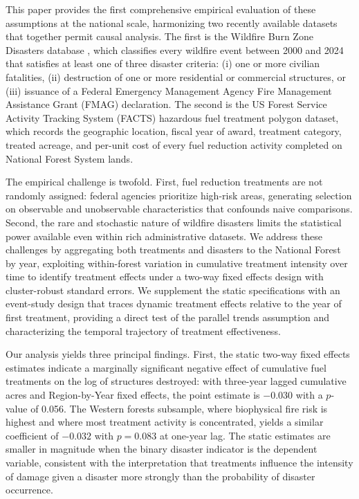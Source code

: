 \documentclass[12pt, letterpaper]{article}
\begin{document}
This paper provides the first comprehensive empirical evaluation of these assumptions at the national scale, harmonizing two recently available datasets that together permit causal analysis. The first is the Wildfire Burn Zone Disasters database \citep{wilner2025}, which classifies every wildfire event between 2000 and 2024 that satisfies at least one of three disaster criteria: (i) one or more civilian fatalities, (ii) destruction of one or more residential or commercial structures, or (iii) issuance of a Federal Emergency Management Agency Fire Management Assistance Grant (FMAG) declaration. The second is the US Forest Service Activity Tracking System (FACTS) hazardous fuel treatment polygon dataset, which records the geographic location, fiscal year of award, treatment category, treated acreage, and per-unit cost of every fuel reduction activity completed on National Forest System lands.

The empirical challenge is twofold. First, fuel reduction treatments are not randomly assigned: federal agencies prioritize high-risk areas, generating selection on observable and unobservable characteristics that confounds naive comparisons. Second, the rare and stochastic nature of wildfire disasters limits the statistical power available even within rich administrative datasets. We address these challenges by aggregating both treatments and disasters to the National Forest by year, exploiting within-forest variation in cumulative treatment intensity over time to identify treatment effects under a two-way fixed effects design with cluster-robust standard errors. We supplement the static specifications with an event-study design that traces dynamic treatment effects relative to the year of first treatment, providing a direct test of the parallel trends assumption and characterizing the temporal trajectory of treatment effectiveness.

Our analysis yields three principal findings. First, the static two-way fixed effects estimates indicate a marginally significant negative effect of cumulative fuel treatments on the log of structures destroyed: with three-year lagged cumulative acres and Region-by-Year fixed effects, the point estimate is $-0.030$ with a $p$-value of 0.056. The Western forests subsample, where biophysical fire risk is highest and where most treatment activity is concentrated, yields a similar coefficient of $-0.032$ with $p = 0.083$ at one-year lag. The static estimates are smaller in magnitude when the binary disaster indicator is the dependent variable, consistent with the interpretation that treatments influence the intensity of damage given a disaster more strongly than the probability of disaster occurrence.
\end{document}
